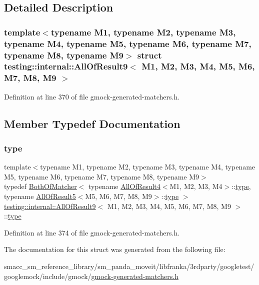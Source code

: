 \subsection{Detailed Description}
\subsubsection*{template$<$typename M1, typename M2, typename M3, typename M4, typename M5, typename M6, typename M7, typename M8, typename M9$>$\newline
struct testing\+::internal\+::\+All\+Of\+Result9$<$ M1, M2, M3, M4, M5, M6, M7, M8, M9 $>$}



Definition at line 370 of file gmock-\/generated-\/matchers.\+h.



\subsection{Member Typedef Documentation}
\mbox{\label{structtesting_1_1internal_1_1AllOfResult9_ade56e18d2e0b745968b87fc394710edc}} 
\subsubsection{\texorpdfstring{type}{type}}
{\footnotesize\ttfamily template$<$typename M1, typename M2, typename M3, typename M4, typename M5, typename M6, typename M7, typename M8, typename M9$>$ \\
typedef \hyperlink{classtesting_1_1internal_1_1BothOfMatcher}{Both\+Of\+Matcher}$<$ typename \hyperlink{structtesting_1_1internal_1_1AllOfResult4}{All\+Of\+Result4}$<$M1, M2, M3, M4$>$\+::\hyperlink{structtesting_1_1internal_1_1AllOfResult9_ade56e18d2e0b745968b87fc394710edc}{type}, typename \hyperlink{structtesting_1_1internal_1_1AllOfResult5}{All\+Of\+Result5}$<$M5, M6, M7, M8, M9$>$\+::\hyperlink{structtesting_1_1internal_1_1AllOfResult9_ade56e18d2e0b745968b87fc394710edc}{type} $>$ \hyperlink{structtesting_1_1internal_1_1AllOfResult9}{testing\+::internal\+::\+All\+Of\+Result9}$<$ M1, M2, M3, M4, M5, M6, M7, M8, M9 $>$\+::\hyperlink{structtesting_1_1internal_1_1AllOfResult9_ade56e18d2e0b745968b87fc394710edc}{type}}



Definition at line 374 of file gmock-\/generated-\/matchers.\+h.



The documentation for this struct was generated from the following file\+:\begin{DoxyCompactItemize}
\item 
smacc\+\_\+sm\+\_\+reference\+\_\+library/sm\+\_\+panda\+\_\+moveit/libfranka/3rdparty/googletest/googlemock/include/gmock/\hyperlink{gmock-generated-matchers_8h}{gmock-\/generated-\/matchers.\+h}\end{DoxyCompactItemize}
